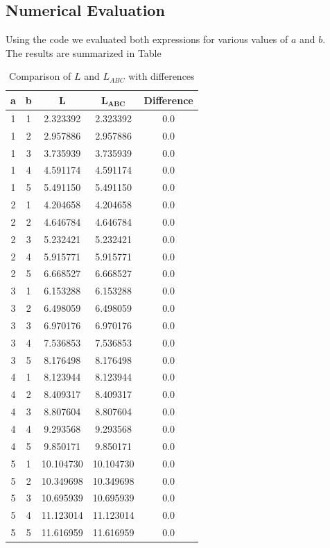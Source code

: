 \documentclass[a4paper, 12pt]{report}
\begin{document}
    \newpage
    \subsection{Numerical Evaluation}
    Using the code we evaluated both expressions for various values of $a$ and $b$.\\
    The results are summarized in Table
    \begin{table}[H]
        \centering
        \begin{tabular}{|c|c|c|c|c|}
            \hline
            \textbf{a} & \textbf{b} & $\bm{L}$ & $\bm{L_{ABC}}$ & \textbf{Difference} \\
            \hline
            1 & 1 & 2.323392 & 2.323392 & 0.0 \\
            1 & 2 & 2.957886 & 2.957886 & 0.0 \\
            1 & 3 & 3.735939 & 3.735939 & 0.0 \\
            1 & 4 & 4.591174 & 4.591174 & 0.0 \\
            1 & 5 & 5.491150 & 5.491150 & 0.0 \\
            2 & 1 & 4.204658 & 4.204658 & 0.0 \\
            2 & 2 & 4.646784 & 4.646784 & 0.0 \\
            2 & 3 & 5.232421 & 5.232421 & 0.0 \\
            2 & 4 & 5.915771 & 5.915771 & 0.0 \\
            2 & 5 & 6.668527 & 6.668527 & 0.0 \\
            3 & 1 & 6.153288 & 6.153288 & 0.0 \\
            3 & 2 & 6.498059 & 6.498059 & 0.0 \\
            3 & 3 & 6.970176 & 6.970176 & 0.0 \\
            3 & 4 & 7.536853 & 7.536853 & 0.0 \\
            3 & 5 & 8.176498 & 8.176498 & 0.0 \\
            4 & 1 & 8.123944 & 8.123944 & 0.0 \\
            4 & 2 & 8.409317 & 8.409317 & 0.0 \\
            4 & 3 & 8.807604 & 8.807604 & 0.0 \\
            4 & 4 & 9.293568 & 9.293568 & 0.0 \\
            4 & 5 & 9.850171 & 9.850171 & 0.0 \\
            5 & 1 & 10.104730 & 10.104730 & 0.0 \\
            5 & 2 & 10.349698 & 10.349698 & 0.0 \\
            5 & 3 & 10.695939 & 10.695939 & 0.0 \\
            5 & 4 & 11.123014 & 11.123014 & 0.0 \\
            5 & 5 & 11.616959 & 11.616959 & 0.0 \\
            \hline
        \end{tabular}
        \caption{Comparison of $L$ and $L_{ABC}$ with differences}
    \end{table}
        \vspace{-2em}
        
\end{document}
